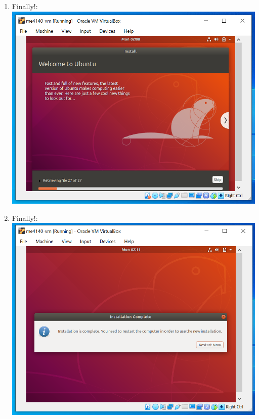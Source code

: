 \documentclass[12pt]{article}
\begin{document}
\begin{description}
\begin{enumerate}
\item Finally!: \vspace{20mm} \\
      		\includegraphics[scale=.6]{Capture20.png}
      		\item Finally!: \vspace{20mm} \\
      		\includegraphics[scale=.6]{Capture21.png}
\end{enumerate}    
\end{description}
\end{document}
